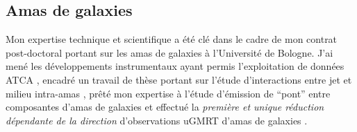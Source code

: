 %
%





\newpage
\subsection*{Amas de galaxies}\label{pastwork.nenufar}

\pg
Mon expertise technique et scientifique a \'et\'e cl\'e dans le cadre de mon contrat post-doctoral portant sur les amas de galaxies \`a l'Universit\'e de Bologne. J'ai men\'e les d\'eveloppements instrumentaux ayant permis l'exploitation de donn\'ees ATCA \cite{2022MNRAS.515.1871R}, encadr\'e un travail de th\`ese portant sur l'\'etude d'interactions entre jet et milieu intra-amas \cite{2021A&A...650A.170B}, pr\^et\'e mon expertise \`a l'\'etude d'\'emission de ``pont'' entre composantes d'amas de galaxies \cite{2021ApJ...907...32B} et effectu\'e la \textit{premi\`ere et unique r\'eduction d\'ependante de la direction} d'observations uGMRT d'amas de galaxies \cite{2020A&A...636A..30R}. %


